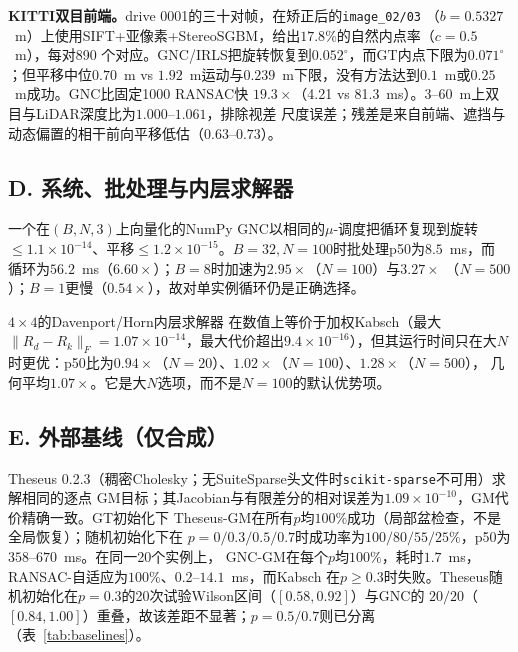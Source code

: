 \noindent\textbf{KITTI双目前端。}drive 0001的三十对帧，在矫正后的\texttt{image\_02/03}
（$b=0.5327$~m）上使用SIFT+亚像素+StereoSGBM，给出$17.8\%$的自然内点率（$c=0.5$~m），每对890
个对应。GNC/IRLS把旋转恢复到$0.052^\circ$，而GT内点下限为$0.071^\circ$；但平移中位$0.70$~m vs
$1.92$~m运动与$0.239$~m下限，没有方法达到$0.1$~m或$0.25$~m成功。GNC比固定1000 RANSAC快
$19.3\times$（4.21 vs 81.3~ms）。$3$--$60$~m上双目与LiDAR深度比为$1.000$--$1.061$，排除视差
尺度误差；残差是来自前端、遮挡与动态偏置的相干前向平移低估（$0.63$--$0.73$）。

\subsection*{D. 系统、批处理与内层求解器}
\label{app:systems}

一个在$(B,N,3)$上向量化的NumPy GNC以相同的$\mu$-调度把循环复现到旋转
$\le1.1\times10^{-14}$、平移$\le1.2\times10^{-15}$。$B=32,N=100$时批处理p50为$8.5$~ms，而
循环为$56.2$~ms（$6.60\times$）；$B=8$时加速为$2.95\times$（$N=100$）与$3.27\times$
（$N=500$）；$B=1$更慢（$0.54\times$），故对单实例循环仍是正确选择。

$4\times4$的Davenport/Horn内层求解器 \cite{horn1987}在数值上等价于加权Kabsch（最大
$\|R_d-R_k\|_F=1.07\times10^{-14}$，最大代价超出$9.4\times10^{-16}$），但其运行时间只在大$N$
时更优：p50比为$0.94\times$（$N=20$）、$1.02\times$（$N=100$）、$1.28\times$（$N=500$），
几何平均$1.07\times$。它是大$N$选项，而不是$N=100$的默认优势项。

\subsection*{E. 外部基线（仅合成）}
\label{app:baselines}

Theseus 0.2.3（稠密Cholesky；无SuiteSparse头文件时\texttt{scikit-sparse}不可用）求解相同的逐点
GM目标；其Jacobian与有限差分的相对误差为$1.09\times10^{-10}$，GM代价精确一致。GT初始化下
Theseus-GM在所有$p$均$100\%$成功（局部盆检查，不是全局恢复）；随机初始化下在
$p=0/0.3/0.5/0.7$时成功率为$100/80/55/25\%$，p50为$358$--$670$~ms。在同一20个实例上，
GNC-GM在每个$p$均$100\%$，耗时$1.7$~ms，RANSAC-自适应为$100\%$、$0.2$--$14.1$~ms，而Kabsch
在$p\ge0.3$时失败。Theseus随机初始化在$p=0.3$的20次试验Wilson区间（$[0.58,0.92]$）与GNC的
$20/20$（$[0.84,1.00]$）重叠，故该差距不显著；$p=0.5/0.7$则已分离（表~\ref{tab:baselines}）。

